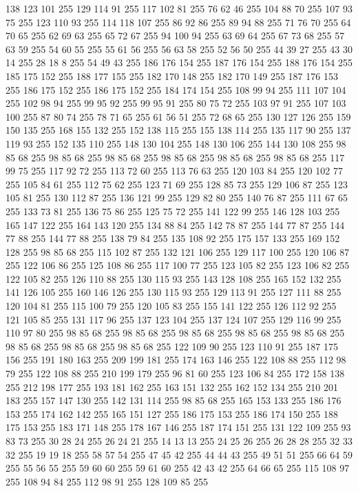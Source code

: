 138 123 101 255 129 114 91 255 117 102 81 255 76 62 46 255 104 88 70 255 107 93 75 255 123 110 93 255 114 118 107 255 86 92 86 255 89 94 88 255 71 76 70 255 64 70 65 255 62 69 63 255 65 72 67 255 94 100 94 255 63 69 64 255 67 73 68 255 57 63 59 255 54 60 55 255 55 61 56 255 56 63 58 255 52 56 50 255 44 39 27 255 43 30 14 255 28 18 8 255 54 49 43 255 186 176 154 255 187 176 154 255 188 176 154 255 185 175 152 255 188 177 155 255 182 170 148 255 182 170 149 255 187 176 153 255 186 175 152 255 186 175 152 255 184 174 154 255 108 99 94 255 111 107 104 255 102 98 94 255 99 95 92 255 99 95 91 255 80 75 72 255 103 97 91 255 107 103 100 255 87 80 74 255 78 71 65 255 61 56 51 255 72 68 65 255 130 127 126 255 159 150 135 255 168 155 132 255 152 138 115 255 155 138 114 255 135 117 90 255 137 119 93 255 152 135 110 255 148 130 104 255 148 130 106 255 144 130 108 255 98 85 68 255 98 85 68 255 98 85 68 255 98 85 68 255
98 85 68 255 98 85 68 255 117 99 75 255 117 92 72 255 113 72 60 255 113 76 63 255 120 103 84 255 120 102 77 255 105 84 61 255 112 75 62 255 123 71 69 255 128 85 73 255 129 106 87 255 123 105 81 255 130 112 87 255 136 121 99 255 129 82 80 255 140 76 87 255 111 67 65 255 133 73 81 255 136 75 86 255 125 75 72 255 141 122 99 255 146 128 103 255 165 147 122 255 164 143 120 255 134 88 84 255 142 78 87 255 144 77 87 255 144 77 88 255 144 77 88 255 138 79 84 255 135 108 92 255 175 157 133 255 169 152 128 255 98 85 68 255 115 102 87 255 132 121 106 255 129 117 100 255 120 106 87 255 122 106 86 255 125 108 86 255 117 100 77 255 123 105 82 255 123 106 82 255 122 105 82 255 126 110 88 255 130 115 93 255 143 128 108 255 165 152 132 255 141 126 105 255 160 146 126 255 130 115 93 255 129 113 91 255 127 111 88 255 120 104 81 255 115 100 79 255 120 105 83 255 155 141 122 255 126 112 92 255 121 105 85 255 131 117 96 255 137 123 104 255 137 124 107 255
129 116 99 255 110 97 80 255 98 85 68 255 98 85 68 255 98 85 68 255 98 85 68 255 98 85 68 255 98 85 68 255 98 85 68 255 98 85 68 255 122 109 90 255 123 110 91 255 187 175 156 255 191 180 163 255 209 199 181 255 174 163 146 255 122 108 88 255 112 98 79 255 122 108 88 255 210 199 179 255 96 81 60 255 123 106 84 255 172 158 138 255 212 198 177 255 193 181 162 255 163 151 132 255 162 152 134 255 210 201 183 255 157 147 130 255 142 131 114 255 98 85 68 255 165 153 133 255 186 176 153 255 174 162 142 255 165 151 127 255 186 175 153 255 186 174 150 255 188 175 153 255 183 171 148 255 178 167 146 255 187 174 151 255 131 122 109 255 93 83 73 255 30 28 24 255 26 24 21 255 14 13 13 255 24 25 26 255 26 28 28 255 32 33 32 255 19 19 18 255 58 57 54 255 47 45 42 255 44 44 43 255 49 51 51 255 66 64 59 255 55 56 55 255 59 60 60 255 59 61 60 255 42 43 42 255 64 66 65 255 115 108 97 255 108 94 84 255 112 98 91 255 128 109 85 255

